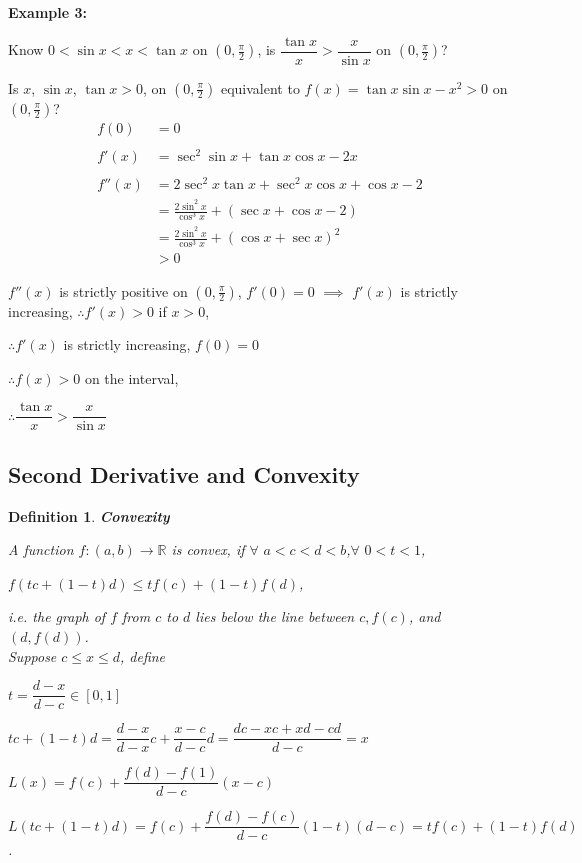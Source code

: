 \documentclass[12pt]{article}
\theoremstyle{plain}
\newtheorem{definition}{Definition}[subsection]
\begin{document}
{    \textbf{Example 3:}
    
    Know $0<\sin x<x<\tan x$ on $(0,\frac{\pi}2)$, 
    is $\dfrac{\tan x}x > \dfrac x{\sin x}$ on $(0, \frac{\pi}2)$?

		Is $x$, $\sin x$, $\tan x>0$, on $(0,\frac{\pi}2)$ equivalent to 
		$f(x) = \tan x \sin x - x^2 > 0$ on $(0, \frac{\pi}2)$?
    \begin{align*}
				f(0)   &= 0\\\\
        f'(x)  &= \sec^2 \sin x + \tan x\cos x - 2x\\\\
        f''(x) &= 2\sec^2 x \tan x + \sec^2 x \cos x + \cos x -2 \\
               &= \frac{2\sin ^ 2 x} {\cos ^3 x} + (\sec x + \cos x - 2)\\
               &= \frac{2\sin ^ 2 x}{\cos ^ 3 x} + (\cos x+ \sec x)^2\\
               &> 0
    \end{align*}

    $f''(x)$ is strictly positive on $(0,\frac{\pi}2)$,
    $f'(0)=0$ $\implies$ $f'(x)$ is strictly increasing,
    $\therefore f'(x) > 0$ if $x>0$,

    $\therefore f'(x)$ is strictly increasing, $f(0)=0$

    $\therefore f(x)>0$ on the interval, 

    $\therefore \dfrac{\tan x}x>\dfrac{x}{\sin x}$
    }


	\newpage
		\subsection{Second Derivative and Convexity} 

		\begin{definition} {\textbf{Convexity}}
			
			A function $f:(a,b) \to \mathbb{R}$ is convex,
			if	$\forall\,\, a < c < d < b$,$\forall\,\, 0 < t< 1$, 
			\begin{center}
						$f(tc+(1-t)d) \leq tf(c) +(1-t)f(d)$, 
				\end{center}
			i.e.	the graph of $f$ from $c$ to $d$
			lies below the line between $c, f(c)$, and $(d, f(d))$. \\

			Suppose $c \leq x\leq d$, define 
			\begin{description}
			\item $t = \dfrac{d-x}{d-c} \in [0,1]$
			\item $tc + (1-t)d= \dfrac{d-x}{d-x}c+\dfrac{x-c}{d-c}d 
								=\dfrac{dc-xc+xd-cd}{d-c}=x$
			\item $L(x) = f(c) + \dfrac{f(d) - f(1)}{d-c}(x-c)$
			\item $L(tc+(1-t)d) = f(c) + \dfrac{f(d)-f(c)}{d-c}(1-t)(d-c) 
			= tf(c)+(1-t)f(d)$.\\

		\end{description}
						\end{definition}
		
\end{document}
